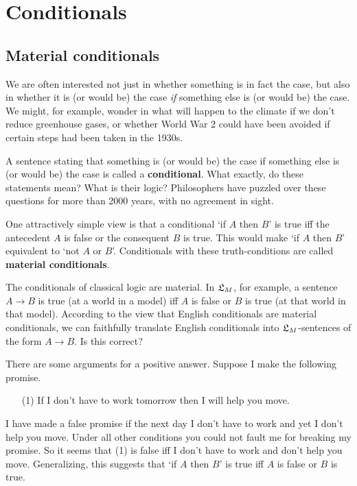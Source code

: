 \chapter{Conditionals}\label{ch:conditionals}

\section{Material conditionals}\label{sec:material}

We are often interested not just in whether something is in fact the case, but
also in whether it is (or would be) the case \emph{if} something else is (or
would be) the case. We might, for example, wonder in what will happen to the
climate if we don't reduce greenhouse gases, or whether World War 2 could have
been avoided if certain steps had been taken in the 1930s.

A sentence stating that something is (or would be) the case if something else is
(or would be) the case is called a \textbf{conditional}. What exactly, do these
statements mean? What is their logic? Philosophers have puzzled over these
questions for more than 2000 years, with no agreement in sight.

One attractively simple view is that a conditional `if $A$ then $B$' is true iff
the antecedent $A$ is false or the consequent $B$ is true. This would make `if
$A$ then $B$' equivalent to `not $A$ or $B$'. Conditionals with these
truth-conditions are called \textbf{material conditionals}.

The conditionals of classical logic are material. In $\mathfrak{L}_{M}$, for example, a
sentence $A \to B$ is true (at a world in a model) iff $A$ is false or $B$ is
true (at that world in that model). According to the view that English
conditionals are material conditionals, we can faithfully translate English
conditionals into $\mathfrak{L}_{M}$-sentences of the form $A \to B$. Is this correct?

There are some arguments for a positive answer. Suppose I make the following
promise.
\begin{itemize}[leftmargin=10mm]
  \item[(1)] If I don't have to work tomorrow then I will help you move.
\end{itemize}
I have made a false promise if the next day I don't have to work and yet I don't
help you move. Under all other conditions you could not fault me for breaking my
promise. So it seems that (1) is false iff I don't have to work and don't help
you move. Generalizing, this suggests that `if $A$ then $B$' is true iff $A$ is
false or $B$ is true.

